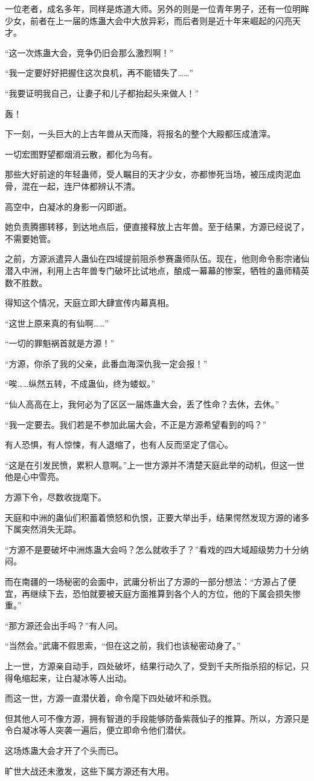 \begin{this_body}
一位老者，成名多年，同样是炼道大师。另外的则是一位青年男子，还有一位明眸少女，前者在上一届的炼蛊大会中大放异彩，而后者则是近十年来崛起的闪亮天才。

“这一次炼蛊大会，竞争仍旧会那么激烈啊！”

“我一定要好好把握住这次良机，再不能错失了……”

“我要证明我自己，让妻子和儿子都抬起头来做人！”

轰！

下一刻，一头巨大的上古年兽从天而降，将报名的整个大殿都压成渣滓。

一切宏图野望都烟消云散，都化为乌有。

那些大好前途的年轻蛊师，受人瞩目的天才少女，亦都惨死当场，被压成肉泥血骨，混在一起，连尸体都辨认不清。

高空中，白凝冰的身影一闪即逝。

她负责腾挪转移，到达地点后，便直接释放上古年兽。至于结果，方源已经说了，不需要她管。

之前，方源派遣异人蛊仙在四域提前阻杀参赛蛊师队伍。现在，他则命令影宗诸仙潜入中洲，利用上古年兽专门破坏比试地点，酿成一幕幕的惨案，牺牲的蛊师精英数不胜数。

得知这个情况，天庭立即大肆宣传内幕真相。

“这世上原来真的有仙啊……”

“一切的罪魁祸首就是方源！”

“方源，你杀了我的父亲，此番血海深仇我一定会报！”

“唉……纵然五转，不成蛊仙，终为蝼蚁。”

“仙人高高在上，我何必为了区区一届炼蛊大会，丢了性命？去休，去休。”

“我一定要去。我们若是不参加此届大会，不正是方源希望看到的吗？”

有人恐惧，有人惊悚，有人退缩了，也有人反而坚定了信心。

“这是在引发民愤，累积人意啊。”上一世方源并不清楚天庭此举的动机，但这一世他是心中雪亮。

方源下令，尽数收拢麾下。

天庭和中洲的蛊仙们积蓄着愤怒和仇恨，正要大举出手，结果愕然发现方源的诸多下属突然消失无踪。

“方源不是要破坏中洲炼蛊大会吗？怎么就收手了？”看戏的四大域超级势力十分纳闷。

而在南疆的一场秘密的会面中，武庸分析出了方源的一部分想法：“方源占了便宜，再继续下去，恐怕就要被天庭方面推算到各个人的方位，他的下属会损失惨重。”

“那方源还会出手吗？”有人问。

“当然会。”武庸不假思索，“但在这之前，我们也该秘密动身了。”

上一世，方源亲自动手，四处破坏，结果行动久了，受到千夫所指杀招的标记，只得龟缩起来，让白凝冰等人出动。

而这一世，方源一直潜伏着，命令麾下四处破坏和杀戮。

但其他人可不像方源，拥有智道的手段能够防备紫薇仙子的推算。所以，方源只是令白凝冰等人突袭一遍后，便立即命令他们潜伏。

这场炼蛊大会才开了个头而已。

旷世大战还未激发，这些下属方源还有大用。

\end{this_body}

